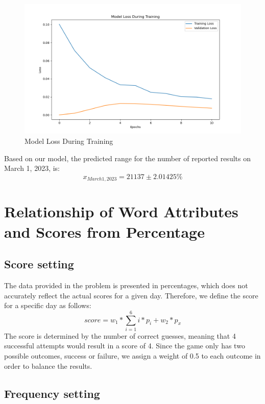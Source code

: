 \documentclass{mcmthesis}  %
\begin{document}
\begin{figure}[h]  %
        \small
        \centering  %
        \includegraphics[width=14cm]{figure/F4.png}  %
        \caption{Model Loss During Training} \label{Figure4}  %
\end{figure}  %

Based on our model, the predicted range for the number of reported results on March 1, 2023, is:
\begin{equation} 
        x_{March1,2023} =21137\pm 2.01425\%
\end{equation}  

\section{Relationship of Word Attributes and Scores from Percentage}

\subsection{Score setting}
The data provided in the problem is presented in percentages, which does not accurately reflect the actual scores for a given day. 
Therefore, we define the score for a specific day as follows:
\begin{equation}  
        score= w_{1}\ast \sum_{i=1}^{6} i\ast p_{i}+w_{2}\ast p_{x}
\end{equation}  
The score is determined by the number of correct guesses, meaning that 4 successful attempts would result in a score of 4. Since 
the game only has two possible outcomes, success or failure, we assign a weight of 0.5 to each outcome in order to balance the results.
\subsection{Frequency setting}
\end{document}
